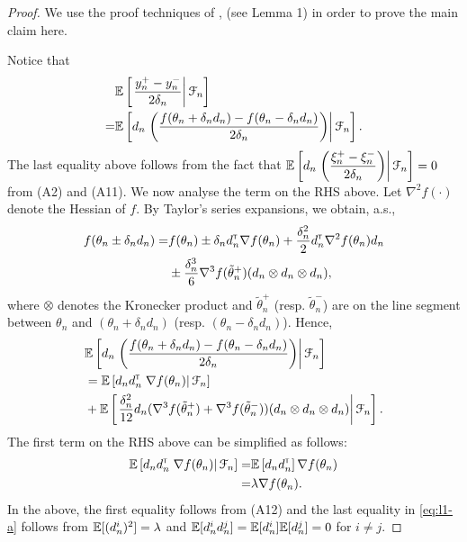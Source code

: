 \begin{proof}
We use the proof techniques of \cite{spall},\cite{prashanth2015rdsa} (see Lemma 1) in order to prove the main claim here.
 
Notice that
\begin{align*}
&\mathbb{E}\left[\left.\dfrac{y_n^+ - y_n^-}{2\delta_n} \right| \mathcal{F}_n\right] \\
= & \mathbb{E}\left[d_n\left.\left(\dfrac{f(\theta_n+\delta_n d_n) - f(\theta_n-\delta_n d_n)}{2\delta_n}\right) \right| \mathcal{F}_n\right].
\end{align*}
The last equality above follows from the fact that $\mathbb{E}\left[  d_n\left.\left(\dfrac{\xi_n^+ - \xi_n^-}{2\delta_n}\right) \right| \mathcal{F}_n\right]=0$ from (A2) and (A11). We now analyse the term on the RHS above.
Let $\nabla^2 f(\cdot)$ denote the Hessian of $f$.
By Taylor's series expansions, we obtain, a.s.,
\begin{align*}
f(\theta_n \pm \delta_n d_n) =& f(\theta_n) \pm \delta_n d_n^\mathsf{\scriptscriptstyle T} \nabla f(\theta_n) + \frac{\delta_n^2}{2} d_n^\mathsf{\scriptscriptstyle T} \nabla^2 f(\theta_n) d_n \\
& \pm  \frac{\delta_n^3}{6} \nabla^3 f(\tilde  \theta_n^+)(d_n \otimes d_n \otimes d_n),
\end{align*}
where $\otimes$ denotes the Kronecker product and $\tilde \theta_n^+$ (resp. $\tilde \theta_n^-$) are on the line segment between $\theta_n$ and $(\theta_n + \delta_n d_n)$ (resp. $(\theta_n - \delta_n d_n)$).
Hence,
\begin{align}
&\mathbb{E}\left[d_n\left.\left(\dfrac{f(\theta_n+\delta_n d_n) - f(\theta_n-\delta_n d_n)}{2\delta_n}\right)\right| \mathcal{F}_n \right] \nonumber\\
&= \mathbb{E}\left[d_n d_n^\mathsf{\scriptscriptstyle T} \left.\nabla f(\theta_n)\right| \mathcal{F}_n\right]\nonumber \\
& +   \mathbb{E}\left[\left.\frac{\delta_n^2}{12} d_n (\nabla^3 f(\tilde  \theta_n^+)+\nabla^3 f(\tilde  \theta_n^-))(d_n \otimes d_n \otimes d_n)\right| \mathcal{F}_n\right]. \label{eq:l1}
\end{align}
The first term on the RHS above can be simplified as follows:
\begin{align}
\mathbb{E}\left[d_n d_n^\mathsf{\scriptscriptstyle T} \left.\nabla f(\theta_n)\right| \mathcal{F}_n\right] = &\mathbb{E}\left[d_n d_n^\mathsf{\scriptscriptstyle T} \right] \nabla f(\theta_n) \nonumber\\
= &  \lambda \nabla f(\theta_n). \label{eq:l1-a}
\end{align}
In the above, the first equality follows from (A12) and the last equality in \eqref{eq:l1-a} follows from $\mathbb{E}[(d_n^i)^2] = \lambda$ and $\mathbb{E}[d_n^i d_n^j] = \mathbb{E}[d_n^i] \mathbb{E}[d_n^j] = 0$ for $i\ne j$.


\end{proof}
